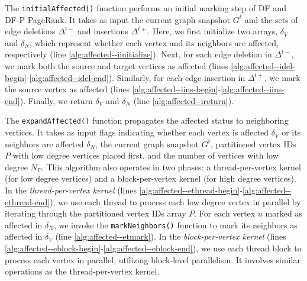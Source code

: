 The \texttt{initialAffected()} function performs an initial marking step of DF and DF-P PageRank. It takes as input the current graph snapshot $G^t$ and the sets of edge deletions $\Delta^{t-}$ and insertions $\Delta^{t+}$. Here, we first initialize two arrays, $\delta_V$ and $\delta_N$, which represent whether each vertex and its neighbors are affected, respectively (line \ref{alg:affected--iinitialize}). Next, for each edge deletion in $\Delta^{t-}$, we mark both the source and target vertices as affected (lines \ref{alg:affected--idel-begin}-\ref{alg:affected--idel-end}). Similarly, for each edge insertion in $\Delta^{t+}$, we mark the source vertex as affected (lines \ref{alg:affected--iins-begin}-\ref{alg:affected--iins-end}). Finally, we return $\delta_V$ and $\delta_N$ (line \ref{alg:affected--ireturn}).

The \texttt{expandAffected()} function propagates the affected status to neighboring vertices. It takes as input flags indicating whether each vertex is affected $\delta_V$ or its neighbors are affected $\delta_N$, the current graph snapshot $G^t$, partitioned vertex IDs $P$ with low degree vertices placed first, and the number of vertices with low degree $N_P$. This algorithm also operates in two phases: a thread-per-vertex kernel (for low degree vertices) and a block-per-vertex kernel (for high degree vertices). In the \textit{thread-per-vertex kernel} (lines \ref{alg:affected--ethread-begin}-\ref{alg:affected--ethread-end}), we use each thread to process each low degree vertex in parallel by iterating through the partitioned vertex IDs array $P$. For each vertex $u$ marked as affected in $\delta_N$, we invoke the \texttt{markNeighbors()} function to mark its neighbors as affected in $\delta_V$ (line \ref{alg:affected--etmark}). In the \textit{block-per-vertex kernel} (lines \ref{alg:affected--eblock-begin}-\ref{alg:affected--eblock-end}), we use each thread block to process each vertex in parallel, utilizing block-level parallelism. It involves similar operations as the thread-per-vertex kernel.
